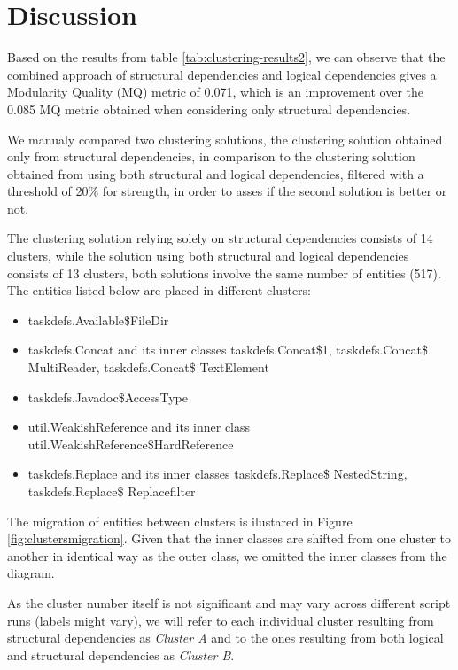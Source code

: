 \documentclass[conference]{IEEEtran}
\begin{document}
\section{Discussion}
\label{discussion}

Based on the results from table \ref{tab:clustering-results2}, we can observe that the combined approach of structural dependencies and logical dependencies gives a Modularity Quality (MQ) metric of 0.071, which is an improvement over the 0.085 MQ metric obtained when considering only structural dependencies. 

We manualy compared two clustering solutions, the clustering solution obtained only from structural dependencies, in comparison to the clustering solution obtained from using both structural and logical dependencies, filtered with a threshold of 20\% for strength, in order to asses if the second solution is better or not.

The clustering solution relying solely on structural dependencies consists of 14 clusters, while the solution using both structural and logical dependencies consists of 13 clusters, both solutions involve the same number of entities (517). The entities listed below are placed in different clusters: 


\begin{itemize}
    \item taskdefs.Available\$FileDir
    \item taskdefs.Concat and its inner classes taskdefs.Concat\$1, taskdefs.Concat\$ MultiReader, taskdefs.Concat\$ TextElement
    \item taskdefs.Javadoc\$AccessType
    \item util.WeakishReference and its inner class util.WeakishReference\$HardReference
    \item taskdefs.Replace and its inner classes taskdefs.Replace\$ NestedString, taskdefs.Replace\$ Replacefilter
\end{itemize}

The migration of entities between clusters is ilustared in Figure \ref{fig:clustersmigration}. Given that the inner classes are shifted from one cluster to another in identical way as the outer class, we omitted the inner classes from the diagram.

As the cluster number itself is not significant and may vary across different script runs (labels might vary), we will refer to each individual cluster resulting from structural dependencies as \textit{Cluster A} and to the ones resulting from both logical and structural dependencies as \textit{Cluster B}.
\end{document}

